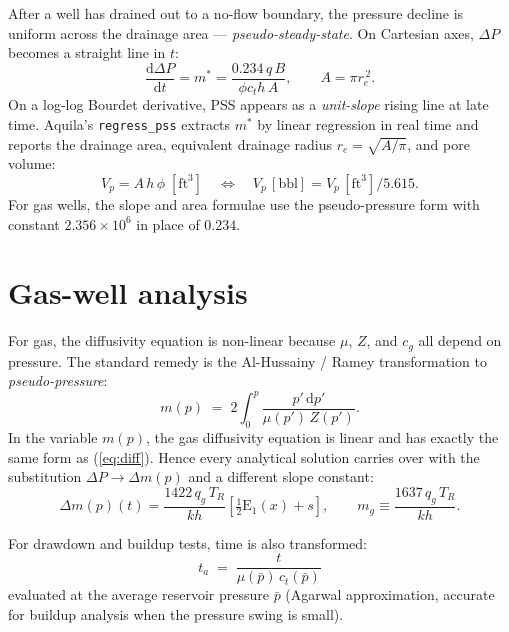 \documentclass[11pt,a4paper]{article}
\newcommand{\D}{\mathrm{d}}
\newcommand{\Ein}{\mathrm{E}_1}
\newcommand{\kh}{kh}
\newcommand{\mpres}{m(p)}
\begin{document}
After a well has drained out to a no-flow boundary, the pressure decline
is uniform across the drainage area — \emph{pseudo-steady-state}. On
Cartesian axes, $\Delta P$ becomes a straight line in $t$:
\begin{equation}
    \frac{\D\Delta P}{\D t} = m^\ast = \frac{0.234\,q\,B}{\phi c_t h\,A},
    \qquad
    A = \pi r_e^{\,2}.
\end{equation}
On a log-log Bourdet derivative, PSS appears as a \emph{unit-slope}
rising line at late time. Aquila's \texttt{regress\_pss} extracts
$m^\ast$ by linear regression in real time and reports the drainage
area, equivalent drainage radius $r_e = \sqrt{A/\pi}$, and pore
volume:
\begin{equation}
    V_p = A\,h\,\phi \;[\mathrm{ft}^3]
          \quad\Longleftrightarrow\quad
          V_p \,[\mathrm{bbl}] = V_p\,[\mathrm{ft}^3]/5.615.
\end{equation}
For gas wells, the slope and area formulae use the pseudo-pressure form
with constant $2.356\times 10^6$ in place of $0.234$.

\section{Gas-well analysis}
\label{sec:gas}

For gas, the diffusivity equation is non-linear because $\mu$, $Z$, and
$c_g$ all depend on pressure. The standard remedy is the Al-Hussainy /
Ramey transformation to \emph{pseudo-pressure}:
\begin{equation}
    \mpres \;=\; 2\!\int_0^p \frac{p'\,\D p'}{\mu(p')\,Z(p')}.
    \label{eq:mp}
\end{equation}
In the variable $\mpres$, the gas diffusivity equation is linear and has
exactly the same form as (\ref{eq:diff}). Hence every analytical
solution carries over with the substitution $\Delta P \to \Delta\mpres$ and
a different slope constant:
\begin{equation}
    \Delta\mpres(t) = \frac{1422\,q_g\,T_R}{\kh}\!\left[\tfrac{1}{2}\Ein(x) + s\right],
    \qquad
    m_g \equiv \frac{1637\,q_g\,T_R}{\kh}.
\end{equation}

For drawdown and buildup tests, time is also transformed:
\begin{equation}
    t_a \;=\; \frac{t}{\mu(\bar p)\,c_t(\bar p)}
\end{equation}
evaluated at the average reservoir pressure $\bar p$
(Agarwal approximation, accurate for buildup analysis when the pressure
swing is small).
\end{document}
